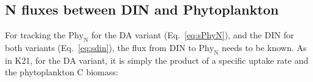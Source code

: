 \documentclass[gmd, manuscript]{copernicus}
\begin{document}
\subsection{N fluxes between DIN and Phytoplankton}\label{S:DescFlux}
For tracking the $\text{Phy}_{\text{N}}$ for the DA variant (Eq.~\ref{eq:sPhyN}), and the DIN for both variants (Eq.~\ref{eq:sdin}), the flux from DIN to $\text{Phy}_{\text{N}}$ needs to be known. As in K21, for the DA variant, it is simply the product of a specific uptake rate and the phytoplankton C biomass:
\end{document}
